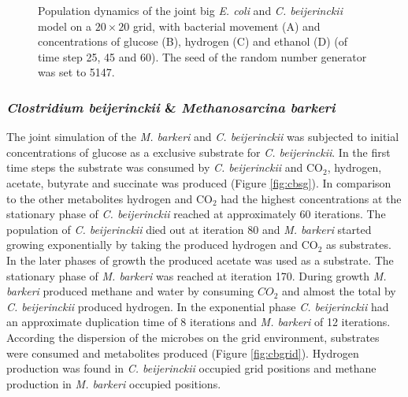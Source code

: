 \begin{figure}[h!]
{\begin{minipage}[t]{0.3\textwidth}
  \end{minipage}
  }
  \caption{Population dynamics of the joint big \emph{E. coli} and \emph{C. beijerinckii} model on a $20\times20$ grid, with bacterial movement (A) and concentrations of glucose (B), hydrogen (C) and ethanol (D) (of time step 25, 45 and 60). The seed of the random number generator was set to 5147.}
  \label{fig:cegrid}
\end{figure}

\subsubsection{\textit{Clostridium beijerinckii} \& \textit{Methanosarcina barkeri}}
The joint simulation of the \textit{M. barkeri} and \textit{C. beijerinckii} was subjected to initial concentrations of glucose as a exclusive substrate for \textit{C. beijerinckii}. In the first time steps the substrate was consumed by \textit{C. beijerinckii} and CO$_2$, hydrogen, acetate, butyrate and succinate was produced (Figure \hyperref[fig:cbsg]{\ref{fig:cbsg}}). 
In comparison to the other metabolites hydrogen and CO$_2$ had the highest concentrations at the stationary phase of \textit{C. beijerinckii} reached at approximately 60 iterations. The population of \textit{C. beijerinckii} died out at iteration 80 and \textit{M. barkeri} started growing exponentially by taking the produced hydrogen and CO$_2$ as substrates. 
In the later phases of growth the produced acetate was used as a substrate. The stationary phase of \textit{M. barkeri} was reached at iteration 170. 
During growth \textit{M. barkeri} produced methane and water by consuming $CO_2$ and almost the total by \textit{C. beijerinckii} produced hydrogen. 
In the exponential phase \textit{C. beijerinckii} had an approximate duplication time of 8 iterations and \textit{M. barkeri} of 12 iterations.
According the dispersion of the microbes on the grid environment, substrates were consumed and metabolites produced (Figure \hyperref[fig:cbgrid]{\ref{fig:cbgrid}}). Hydrogen production was found in \textit{C. beijerinckii} occupied grid positions and methane production in \textit{M. barkeri} occupied positions.
